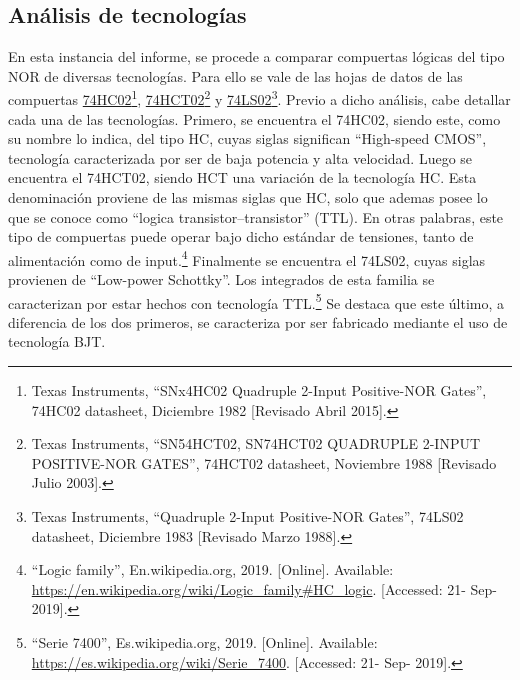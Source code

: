 

\usepackage{tikz}


\subsection{Análisis de tecnologías}

En esta instancia del informe, se procede a comparar compuertas lógicas del tipo NOR de diversas tecnologías. Para ello se vale de las hojas de datos de las compuertas \href{http://www.ti.com/product/SN74HC02}{74HC02}\footnote{Texas Instruments, ``SNx4HC02 Quadruple 2-Input Positive-NOR Gates'', 74HC02 datasheet, Diciembre 1982 [Revisado Abril 2015].}, \href{http://www.ti.com/product/SN74HCT02}{74HCT02}\footnote{Texas Instruments, ``SN54HCT02, SN74HCT02 QUADRUPLE 2-INPUT POSITIVE-NOR GATES'', 74HCT02 datasheet, Noviembre 1988 [Revisado Julio 2003].} y \href{http://www.ti.com/product/SN74LS02}{74LS02}\footnote{Texas Instruments, ``Quadruple 2-Input Positive-NOR Gates'', 74LS02 datasheet, Diciembre 1983 [Revisado Marzo 1988].}. Previo a dicho análisis, cabe detallar cada una de las tecnologías. Primero, se encuentra el 74HC02, siendo este, como su nombre lo indica, del tipo HC, cuyas siglas significan ``High-speed CMOS'', tecnología caracterizada por ser de baja potencia y alta velocidad. Luego se encuentra el 74HCT02, siendo HCT una variación de la tecnología HC. Esta denominación proviene de las mismas siglas que HC, solo que ademas posee lo que se conoce como ``logica transistor–transistor'' (TTL). En otras palabras, este tipo de compuertas puede operar bajo dicho estándar de tensiones, tanto de alimentación como de input.\footnote{``Logic family'', En.wikipedia.org, 2019. [Online]. Available: \url{https://en.wikipedia.org/wiki/Logic\_family\#HC\_logic}. [Accessed: 21- Sep- 2019].} Finalmente se encuentra el 74LS02, cuyas siglas provienen de ``Low-power Schottky''. Los integrados de esta familia se caracterizan por estar hechos con tecnología TTL.\footnote{``Serie 7400'', Es.wikipedia.org, 2019. [Online]. Available: \url{https://es.wikipedia.org/wiki/Serie\_7400}. [Accessed: 21- Sep- 2019].} Se destaca que este último, a diferencia de los dos primeros, se caracteriza por ser fabricado mediante el uso de tecnología BJT.

